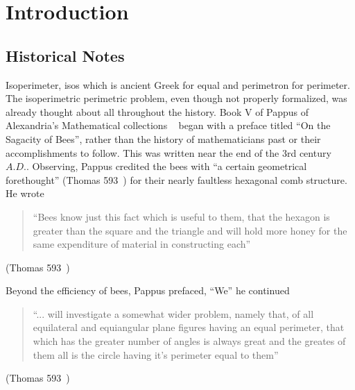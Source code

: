 \documentclass[a4paper]{book}
\begin{document}
\chapter{Introduction}
\section{Historical Notes}
Isoperimeter, isos which is ancient Greek for equal and perimetron for perimeter. The isoperimetric perimetric problem, even though not properly formalized, was already thought about all throughout the history. 
\newline
\newline
Book V of Pappus of Alexandria's Mathematical collections ~\cite{wiegert2010sagacity} began with a preface titled ``On the Sagacity of Bees'', rather than the history of mathematicians past or their accomplishments to follow. This was written near the end of the 3rd century $A.D.$. Observing, Pappus credited the bees with ``a certain geometrical forethought'' (Thomas 593~\cite{ivor1941selections}) for their nearly faultless hexagonal comb structure. He wrote
\begin{center}
    \begin{quote}
        ``Bees know just this fact which is useful to them, that 
        the hexagon is greater than the square and the triangle 
        and will hold more honey for the same expenditure of 
        material in constructing each''
    \end{quote}
    (Thomas 593~\cite{ivor1941selections})
\end{center}
Beyond the efficiency of bees, Pappus prefaced, ``We'' he continued
\begin{center}
    \begin{quote}
        ``... will {}investigate a somewhat wider problem, namely that, 
        of all equilateral and equiangular plane figures having an equal 
        perimeter, that which has the greater number of angles is always great 
        and the greates of them all is the circle having it's perimeter equal to them''
    \end{quote}
    (Thomas 593~\cite{ivor1941selections})
\end{center}
\end{document}
